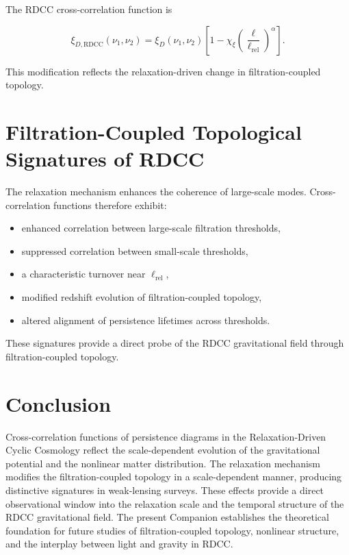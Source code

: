 \documentclass[11pt,a4paper]{article}
\begin{document}
The RDCC cross-correlation function is

\begin{equation}
    \xi_{D,\mathrm{RDCC}}(\nu_{1}, \nu_{2})
    = \xi_{D}(\nu_{1}, \nu_{2})
      \left[
        1 - \chi_{\xi}
        \left(\frac{\ell}{\ell_{\mathrm{rel}}}\right)^{\alpha}
      \right].
\end{equation}

This modification reflects the relaxation-driven change in filtration-coupled 
topology.
\section{Filtration-Coupled Topological Signatures of RDCC}

The relaxation mechanism enhances the coherence of large-scale modes. Cross-
correlation functions therefore exhibit:

\begin{itemize}
    \item enhanced correlation between large-scale filtration thresholds,
    \item suppressed correlation between small-scale thresholds,
    \item a characteristic turnover near $\ell_{\mathrm{rel}}$,
    \item modified redshift evolution of filtration-coupled topology,
    \item altered alignment of persistence lifetimes across thresholds.
\end{itemize}

These signatures provide a direct probe of the RDCC gravitational field through 
filtration-coupled topology.
\section{Conclusion}

Cross-correlation functions of persistence diagrams in the Relaxation-Driven Cyclic 
Cosmology reflect the scale-dependent evolution of the gravitational potential and 
the nonlinear matter distribution. The relaxation mechanism modifies the 
filtration-coupled topology in a scale-dependent manner, producing distinctive 
signatures in weak-lensing surveys. These effects provide a direct observational 
window into the relaxation scale and the temporal structure of the RDCC 
gravitational field. The present Companion establishes the theoretical foundation 
for future studies of filtration-coupled topology, nonlinear structure, and the 
interplay between light and gravity in RDCC.


\nocite{*}

\end{document}
